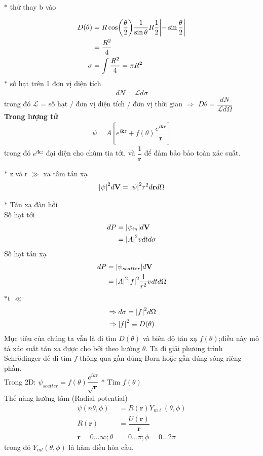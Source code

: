 \documentclass{report}
\renewcommand{\l}{\ell}
\begin{document}
\noindent$\ast$ thử thay b vào

\begin{align*}
	D(\theta) & = R \cos(\dfrac{\theta}{2}) \dfrac{1}{\sin\theta} R \dfrac{1}{2}\abs{-\sin\dfrac{\theta}{2}} \\
	          & = \dfrac{R^2}{4}                                                                             \\
	\sigma    & = \int \dfrac{R^2}{4}= \pi R^2
\end{align*}
$\ast$ số hạt trên 1 đơn vị diện tích
\begin{align*}
	dN = \mathcal{L}d\sigma
\end{align*}
trong đó $\mathcal{L}$ = số hạt / đơn vị diện tích / đơn vị thời gian $\Rightarrow$ $D\theta = \dfrac{dN}{\mathcal{L}d\Omega}$\\
\textbf{Trong lượng tử}
\begin{align}
	\psi = A \left[e^{i\mathbf{k}z} + f(\theta)\dfrac{e^{i\mathbf{kr}}}{\mathbf{r}}\right]
\end{align}
trong đó $e^{i\mathbf{k}z}$ đại diện cho chùm tia tới, và $\dfrac{1}{\mathbf{r}}$ để đảm bảo bảo toàn xác suất.

$\ast$ z và r $\gg$ xa tâm tán xạ
\begin{align*}
	\abs{\psi}^2d\mathbf{V} = \abs{\psi}^2r^2d \mathbf{r} d\Omega
\end{align*}

$\ast$ Tán xạ đàn hồi\\
Số hạt tới
\begin{align*}
	dP & = \abs{\psi_{in}}d\mathbf{V} \\
	   & = \abs{A}^2vdtd\sigma
\end{align*}
Số hạt tán xạ
\begin{align*}
	dP & = \abs{\psi_{scatter}}d\mathbf{V}            \\
	   & = \abs{A}^2\abs{f}^2\dfrac{1}{r^2}vdtd\Omega
\end{align*}
$\ast$t $\ll$
\begin{align*}
	 & \Rightarrow d\sigma = \abs{f}^2d\Omega \\
	 & \Rightarrow \abs{f}^2 \equiv D(\theta)
\end{align*}
Mục tiêu của chúng ta vẫn là đi tìm $D(\theta)$ và biên độ tán xạ $f(\theta)$;điều này mô tả xác suất tán xạ được cho bởi theo hướng $\theta$. Ta đi giải phương trình Schr\"{o}dinger để đi tìm $f$ thông qua gần đúng Born hoặc gần đúng sóng riêng phần.\\
Trong 2D: $\psi_{scatter} = f(\theta)\dfrac{e^{ik\mathbf{r}}}{\sqrt{\mathbf{r}}}$
\clearpage
$\ast$ Tìm $f(\theta)$\\
Thế năng hướng tâm (Radial potential)
\begin{align*}
	\psi(n\theta,\phi)             & =R(\mathbf{r})Y_{m\l}(\theta,\phi) \\
	R(\mathbf{r})                  & =\dfrac{U(\mathbf{r})}{\mathbf{r}} \\
	\mathbf{r} =0...\infty ;\theta & = 0...\pi;\phi = 0...2\pi
\end{align*}
trong đó $Y_{ml}(\theta,\phi)$ là hàm điều hòa cầu.
\end{document}
